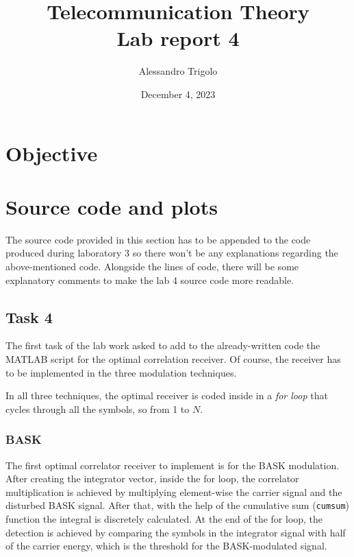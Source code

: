 \title{\vspace{160px} \textbf{\huge{Telecommunication Theory}} \\\vspace{17.5px} \LARGE{Lab report 4}  \vspace{10px}}
\author{Alessandro Trigolo}
\date{December 4, 2023}


\maketitle \newpage

\section*{Objective}

\lstset{style = MATLAB}
\section*{Source code and plots}
The source code provided in this section has to be appended to the code produced during laboratory 3 so there won't be any explanations regarding the above-mentioned code. Alongside the lines of code, there will be some explanatory comments to make the lab 4 source code more readable.

\subsection*{Task 4}
The first task of the lab work asked to add to the already-written code the MATLAB script for the optimal correlation receiver. Of course, the receiver has to be implemented in the three modulation techniques.

In all three techniques, the optimal receiver is coded inside in a \textsl{for loop} that cycles through all the symbols, so from 1 to $N$.

\subsubsection*{BASK}
The first optimal correlator receiver to implement is for the BASK modulation. After creating the integrator vector, inside the for loop, the correlator multiplication is achieved by multiplying element-wise the carrier signal and the disturbed BASK signal. After that, with the help of the cumulative sum (\texttt{cumsum}) function the integral is discretely calculated. At the end of the for loop, the detection is achieved by comparing the symbols in the integrator signal with half of the carrier energy, which is the threshold for the BASK-modulated signal.

